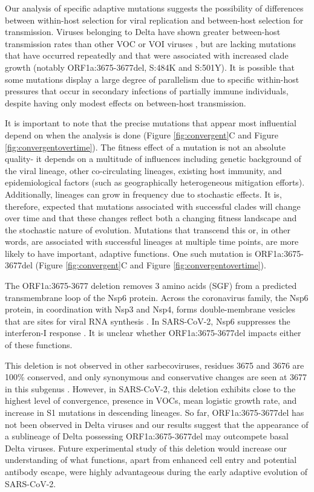 \documentclass[11pt,oneside,letterpaper]{article}
\begin{document}
Our analysis of specific adaptive mutations suggests the possibility of differences between within-host selection for viral replication and between-host selection for transmission. 
Viruses belonging to Delta have shown greater between-host transmission rates than other VOC or VOI viruses \cite{Campbell2021-cx}, but are lacking mutations that have occurred repeatedly and that were associated with increased clade growth (notably ORF1a:3675-3677del, S:484K and S:501Y). 
It is possible that some mutations display a large degree of parallelism due to specific within-host pressures that occur in secondary infections of partially immune individuals, despite having only modest effects on between-host transmission.

It is important to note that the precise mutations that appear most influential depend on when the analysis is done (Figure \ref{fig:convergent}C and Figure \ref{fig:convergentovertime}). 
The fitness effect of a mutation is not an absolute quality- it depends on a multitude of influences including genetic background of the viral lineage, other co-circulating lineages, existing host immunity, and epidemiological factors (such as geographically heterogeneous mitigation efforts). 
Additionally, lineages can grow in frequency due to stochastic effects. It is, therefore, expected that mutations associated with successful clades will change over time and that these changes reflect both a changing fitness landscape and the stochastic nature of evolution. 
Mutations that transcend this or, in other words, are associated with successful lineages at multiple time points, are more likely to have important, adaptive functions. 
One such mutation is ORF1a:3675-3677del (Figure \ref{fig:convergent}C and Figure \ref{fig:convergentovertime}).

The ORF1a:3675-3677 deletion removes 3 amino acids (SGF) from a predicted transmembrane loop \cite{Benvenuto2020-uc} of the Nsp6 protein. 
Across the coronavirus family, the Nsp6 protein, in coordination with Nsp3 and Nsp4, forms double-membrane vesicles that are sites for viral RNA synthesis \cite{Snijder2020-vx}. 
In SARS-CoV-2, Nsp6 suppresses the interferon-I response \cite{Xia2020-zs}. It is unclear whether ORF1a:3675-3677del impacts either of these functions.

This deletion is not observed in other sarbecoviruses, residues 3675 and 3676 are 100\% conserved, and only synonymous and conservative changes are seen at 3677 in this subgenus \cite{Jungreis2021-vv}. 
However, in SARS-CoV-2, this deletion exhibits close to the highest level of convergence, presence in VOCs, mean logistic growth rate, and increase in S1 mutations in descending lineages. 
So far, ORF1a:3675-3677del has not been observed in Delta viruses and our results suggest that the appearance of a sublineage of Delta possessing ORF1a:3675-3677del may outcompete basal Delta viruses. 
Future experimental study of this deletion would increase our understanding of what functions, apart from enhanced cell entry and potential antibody escape, were highly advantageous during the early adaptive evolution of SARS-CoV-2.
\end{document}
